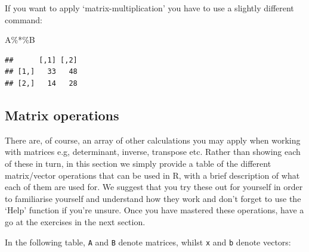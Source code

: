 \documentclass[
]{book}
\newenvironment{Shaded}{\begin{snugshade}}{\end{snugshade}}
\newcommand{\NormalTok}[1]{#1}
\newcommand{\SpecialCharTok}[1]{\textcolor[rgb]{0.00,0.00,0.00}{#1}}
\theoremstyle{definition}
\theoremstyle{definition}
\theoremstyle{definition}
\theoremstyle{definition}
\theoremstyle{remark}
\begin{document}
If you want to apply `matrix-multiplication' you have to use a slightly different command:

\begin{Shaded}
\begin{Highlighting}[]
\NormalTok{A}\SpecialCharTok{\%*\%}\NormalTok{B}
\end{Highlighting}
\end{Shaded}

\begin{verbatim}
##      [,1] [,2]
## [1,]   33   48
## [2,]   14   28
\end{verbatim}

\hypertarget{matrix-operations}{%
\subsection{Matrix operations}\label{matrix-operations}}

There are, of course, an array of other calculations you may apply when working with matrices e.g, determinant, inverse, transpose etc. Rather than showing each of these in turn, in this section we simply provide a table of the different matrix/vector operations that can be used in R, with a brief description of what each of them are used for. We suggest that you try these out for yourself in order to familiarise yourself and understand how they work and don't forget to use the `Help' function if you're unsure. Once you have mastered these operations, have a go at the exercises in the next section.

In the following table, \texttt{A} and \texttt{B} denote matrices, whilst \texttt{x} and \texttt{b} denote vectors:
\end{document}
